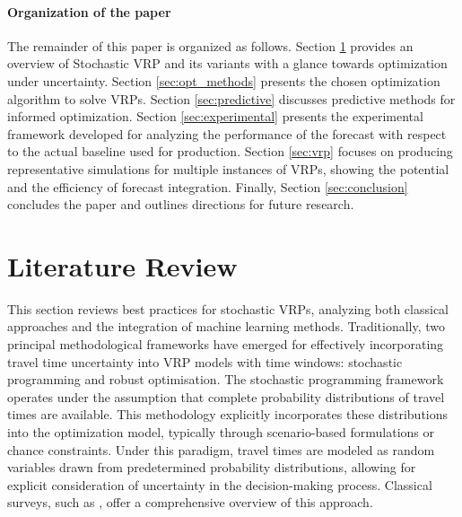 \documentclass[preprint,12pt]{elsarticle}
\begin{document}
\paragraph{Organization of the paper}

The remainder of this paper is organized as follows. Section \ref{sec:svrp} provides an overview of Stochastic VRP and its variants with a glance towards optimization under uncertainty. Section \ref{sec:opt_methods} presents the chosen optimization algorithm to solve VRPs.
Section \ref{sec:predictive} discusses predictive methods for informed optimization. Section \ref{sec:experimental} presents the experimental framework developed for analyzing the performance of the forecast with respect to the actual baseline used for production. Section \ref{sec:vrp} focuses on producing representative simulations for multiple instances of VRPs, showing the potential and the efficiency of forecast integration. Finally, Section \ref{sec:conclusion} concludes the paper and outlines directions for future research.




\bigskip






   
\section{Literature Review}
\label{sec:svrp}

This section reviews best practices for stochastic VRPs, analyzing both classical approaches and the integration of machine learning methods. Traditionally, two principal methodological frameworks have emerged for effectively incorporating travel time uncertainty into VRP models with time windows: stochastic programming and robust optimisation.
The stochastic programming framework operates under the assumption that complete probability distributions of travel times are available. This methodology explicitly incorporates these distributions into the optimization model, typically through scenario-based formulations or chance constraints. Under this paradigm, travel times are modeled as random variables drawn from predetermined probability distributions, allowing for explicit consideration of uncertainty in the decision-making process. Classical surveys, such as \cite{Sahinidis2004, Shapiro2008}, offer a comprehensive overview of this approach.
\end{document}
